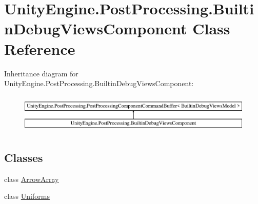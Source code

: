 \hypertarget{class_unity_engine_1_1_post_processing_1_1_builtin_debug_views_component}{}\section{Unity\+Engine.\+Post\+Processing.\+Builtin\+Debug\+Views\+Component Class Reference}
\label{class_unity_engine_1_1_post_processing_1_1_builtin_debug_views_component}
Inheritance diagram for Unity\+Engine.\+Post\+Processing.\+Builtin\+Debug\+Views\+Component\+:\begin{figure}[H]
\begin{center}
\leavevmode
\includegraphics[height=1.911263cm]{class_unity_engine_1_1_post_processing_1_1_builtin_debug_views_component}
\end{center}
\end{figure}
\subsection*{Classes}
\begin{DoxyCompactItemize}
\item 
class \hyperlink{class_unity_engine_1_1_post_processing_1_1_builtin_debug_views_component_1_1_arrow_array}{Arrow\+Array}
\item 
class \hyperlink{class_unity_engine_1_1_post_processing_1_1_builtin_debug_views_component_1_1_uniforms}{Uniforms}
\end{DoxyCompactItemize}
